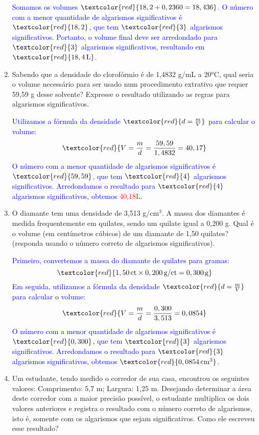 \documentclass[a4paper, 12pt]{article}
\begin{document}
\begin{enumerate}
          \textcolor{blue}{
              Somamos os volumes \(\textcolor{red}{18,2 + 0,2360 = 18,436}\). O número com a menor quantidade de algarismos significativos é \(\textcolor{red}{18,2}\), que tem \(\textcolor{red}{3}\) algarismos significativos. Portanto, o volume final deve ser arredondado para \(\textcolor{red}{3}\) algarismos significativos, resultando em \(\textcolor{red}{18,4 \, \text{L}}\).
          }


    \item Sabendo que a densidade do clorofórmio é de 1,4832 g/mL a 20°C, qual seria o volume necessário para ser usado num procedimento extrativo que requer 59,59 g desse solvente? Expresse o resultado utilizando as regras para algarismos significativos.

          \textcolor{blue}{
              Utilizamos a fórmula da densidade \(\textcolor{red}{d = \frac{m}{V}}\) para calcular o volume:
              \[
                  \textcolor{red}{V = \frac{m}{d} = \frac{59,59}{1,4832} = 40,17}
              \]
              O número com a menor quantidade de algarismos significativos é \(\textcolor{red}{59,59}\), que tem \(\textcolor{red}{4}\) algarismos significativos. Arredondamos o resultado para \(\textcolor{red}{4}\) algarismos significativos, obtemos \textcolor{red}{40,18L}.
          }

    \item O diamante tem uma densidade de 3,513 g/cm\(^3\). A massa dos diamantes é medida frequentemente em quilates, sendo um quilate igual a 0,200 g. Qual é o volume (em centímetros cúbicos) de um diamante de 1,50 quilates? (responda usando o número correto de algarismos significativos).

          \textcolor{blue}{
              Primeiro, convertemos a massa do diamante de quilates para gramas:
              \[
                  \textcolor{red}{1,50 \, \text{ct} \times 0,200 \, \text{g/ct} = 0,300 \, \text{g}}
              \]
              Em seguida, utilizamos a fórmula da densidade \(\textcolor{red}{d = \frac{m}{V}}\) para calcular o volume:
              \[
                  \textcolor{red}{V = \frac{m}{d} = \frac{0,300}{3,513} = 0,0854}
              \]
              O número com a menor quantidade de algarismos significativos é \(\textcolor{red}{0,300}\), que tem \(\textcolor{red}{3}\) algarismos significativos. Arredondamos o resultado para \(\textcolor{red}{3}\) algarismos significativos, obtemos \(\textcolor{red}{0,0854 \, \text{cm}^3}\).
          }

    \item Um estudante, tendo medido o corredor de sua casa, encontrou os seguintes valores: Comprimento: 5,7 m; Largura: 1,25 m. Desejando determinar a área deste corredor com a maior precisão possível, o estudante multiplica os dois valores anteriores e registra o resultado com o número correto de algarismos, isto é, somente com os algarismos que sejam significativos. Como ele escreveu esse resultado?


\end{enumerate}
\end{document}
